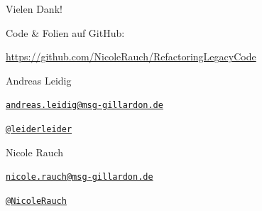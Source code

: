 \begin{frame}{Vielen Dank!}

        Code \& Folien auf GitHub:
        \begin{center}
                \url{https://github.com/NicoleRauch/RefactoringLegacyCode}
        \end{center}

        \begin{block}{Andreas Leidig}
        \begin{description}[Twitterxx]
                \item[E-Mail]  \href{mailto:andreas.leidig@msg-gillardon.de}{\texttt{andreas.leidig@msg-gillardon.de}}
                \item[Twitter] \href{http://twitter.com/leiderleider}{\texttt{@leiderleider}}
        \end{description}
        \end{block}

        \begin{block}{Nicole Rauch}
        \begin{description}[Twitterxx]
                \item[E-Mail]  \href{mailto:nicole.rauch@msg-gillardon.de}{\texttt{nicole.rauch@msg-gillardon.de}}
                \item[Twitter] \href{http://twitter.com/NicoleRauch}{\texttt{@NicoleRauch}}
        \end{description}
        \end{block}
\end{frame}
